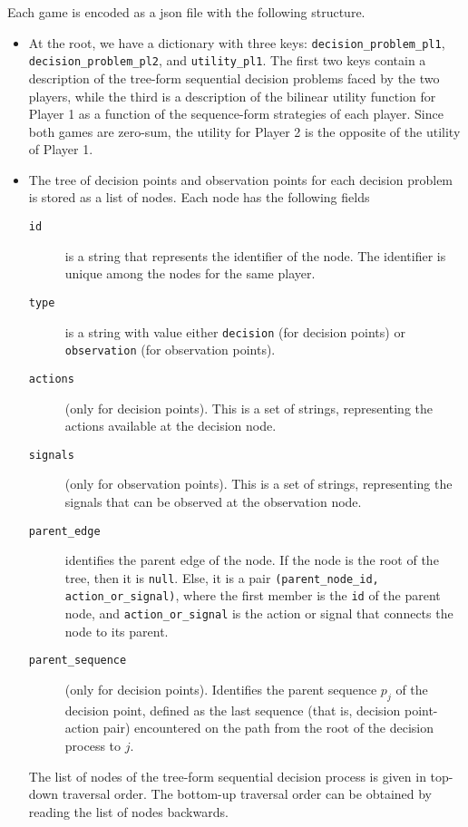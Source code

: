 \documentclass{homework}
\begin{document}
Each game is encoded as a json file with the following structure.
\begin{itemize}
    \item At the root, we have a dictionary with three keys: \verb|decision_problem_pl1|, \verb|decision_problem_pl2|, and \verb|utility_pl1|. The first two keys contain a description of the tree-form sequential decision problems faced by the two players, while the third is a description of the bilinear utility function for Player 1 as a function of the sequence-form strategies of each player. Since both games are zero-sum, the utility for Player 2 is the opposite of the utility of Player 1.
    \item The tree of decision points and observation points for each decision problem is stored as a list of nodes. Each node has the following fields
    \begin{description}
        \item[\texttt{id}] is a string that represents the identifier of the node. The identifier is unique among the nodes for the same player.
        \item[\texttt{type}] is a string with value either \verb|decision| (for decision points) or \verb|observation| (for observation points).
        \item[\texttt{actions}] (only for decision points). This is a set of strings, representing the actions available at the decision node.
        \item[\texttt{signals}] (only for observation points). This is a set of strings, representing the signals that can be observed at the observation node.
        \item[\texttt{parent\_edge}] identifies the parent edge of the node. If the node is the root of the tree, then it is \verb|null|. Else, it is a pair \verb|(parent_node_id, action_or_signal)|, where the first member is the \verb|id| of the parent node, and \verb|action_or_signal| is the action or signal that connects the node to its parent.
        \item[\texttt{parent\_sequence}] (only for decision points). Identifies the parent sequence $p_j$ of the decision point, defined as the last sequence (that is, decision point-action pair) encountered on the path from the root of the
        decision process to $j$.
    \end{description}
    \begin{remark}
        The list of nodes of the tree-form sequential decision process is given in top-down traversal order. The bottom-up traversal order can be obtained by reading the list of nodes backwards.

\end{remark}
\end{itemize}
\end{document}
